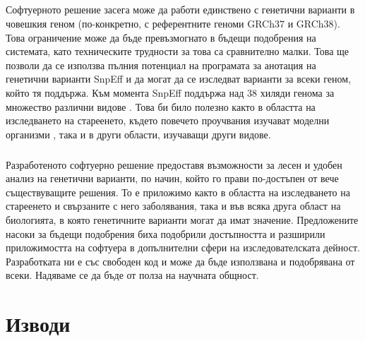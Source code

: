 \documentclass[pdftex,cyrillic,14pt,a4page,twoside,openright]{extreport}
\begin{document}
\paragraph{}
Софтуерното решение засега може да работи единствено с генетични варианти в човешкия геном (по-конкретно, с референтните геноми GRCh37 и GRCh38). Това ограничение може да бъде превъзмогнато в бъдещи подобрения на системата, като техническите трудности за това са сравнително малки. Това ще позволи да се използва пълния потенциал на програмата за анотация на генетични варианти SnpEff и да могат да се изследват варианти за всеки геном, който тя поддържа. Към момента SnpEff поддържа над 38 хиляди генома за множество различни видове \cite{SnpEffWebsite}. Това би било полезно както в областта на изследването на стареенето, където повечето проучвания изучават моделни организми \cite{demagalhaes2004}, така и в други области, изучаващи други видове.

\paragraph{}
Разработеното софтуерно решение предоставя възможности за лесен и удобен анализ на генетични варианти, по начин, който го прави по-достъпен от вече съществуващите решения. То е приложимо както в областта на изследването на стареенето и свързаните с него заболявания, така и във всяка друга област на биологията, в която генетичните варианти могат да имат значение. Предложените насоки за бъдещи подобрения биха подобрили достъпността и разширили приложимостта на софтуера в допълнителни сфери на изследователската дейност. Разработката ни е със свободен код и може да бъде използвана и подобрявана от всеки. Надяваме се да бъде от полза на научната общност.

\chapter{Изводи}
\end{document}
